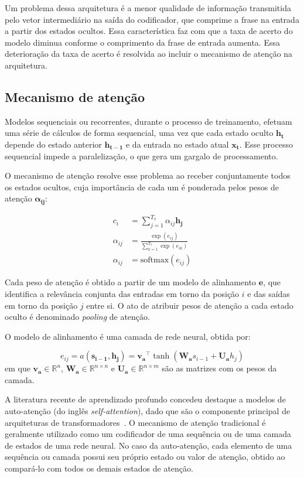 Um problema dessa arquitetura é a menor qualidade de informação transmitida pelo
vetor intermediário na saída do codificador, que comprime a frase na entrada a
partir dos estados ocultos. Essa característica faz com que a taxa de acerto do
modelo diminua conforme o comprimento da frase de entrada aumenta. Essa
deterioração da taxa de acerto é resolvida ao incluir o mecanismo de atenção
na arquitetura.

\subsection{Mecanismo de atenção}
Modelos sequenciais ou recorrentes, durante o processo de treinamento, efetuam
uma série de cálculos de forma sequencial, uma vez que cada estado oculto
$\mathbf{h_t}$ depende do estado anterior $\mathbf{h_{t-1}}$ e da entrada no
estado atual $\mathbf{x_t}$. Esse processo sequencial impede a paralelização, o
que gera um gargalo de processamento.

O mecanismo de atenção \cite{bahdanau2016neural} resolve esse problema ao
receber conjuntamente todos os estados ocultos, cuja importância de cada um é
ponderada pelos pesos de atenção $\mathbf{\alpha_{ij}}$:


\begin{align}
    c_i &= \sum_{j=1}^{T_x} \alpha_{ij} \mathbf{h_j} \\
    \alpha_{ij} &= \frac{\exp(e_{ij})}{\sum_{k=1}^{T_x} \exp(e_{ik})} \\
    \alpha_{ij} &=  \text{softmax}(e_{ij})
\end{align}

Cada peso de atenção é obtido a partir de um modelo de alinhamento $\mathbf{e}$,
que identifica a relevância conjunta das entradas em torno da posição $i$ e das
saídas em torno da posição $j$ entre si. O ato de atribuir pesos de atenção a
cada estado oculto é denominado \textit{pooling} de atenção.

O modelo de alinhamento é uma camada de
rede neural, obtida por:

\begin{equation}
    e_{ij} = a(\mathbf{s_{i-1}}, \mathbf{h_j}) = \mathbf{v_a}^\top \tanh(\mathbf{W_a}s_{i-1} + \mathbf{U_a}h_j)
\end{equation}
em que $\mathbf{v_a} \in \mathbb{R}^n$, $\mathbf{W_a} \in \mathbb{R}^{n \times
n}$ e $\mathbf{U_a} \in \mathbb{R}^{n \times m}$ são as matrizes com os pesos da
camada.

A literatura recente de aprendizado profundo concedeu destaque a modelos de
auto-atenção (do inglês \textit{self-attention}), dado que são o componente
principal de arquiteturas de transformadores~\cite{kim2017structured}. O
mecanismo de atenção tradicional é geralmente utilizado como um codificador de
uma sequência ou de uma camada de estados de uma rede neural. No caso da
auto-atenção, cada elemento de uma sequência ou camada possui seu próprio
estado ou valor de atenção, obtido ao compará-lo com todos os demais estados
de atenção.

